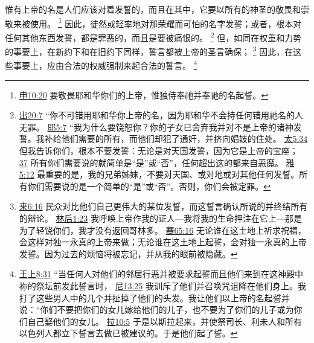 \documentclass[12pt, a4paper, oneside]{ctexart}
\newcounter{parnum}[section]
\newcommand{\N}{%
   \noindent\refstepcounter{parnum}%
    \makebox[\parindent][l]{\textbf{\arabic{parnum}.}}}
\begin{document}
\N 惟有上帝的名是人们应该对着发誓的，而且在其中，它要以所有的神圣的敬畏和崇敬来被使用。
	\footnote {
		\href{https://biblehub.com/deuteronomy/10-20.htm}{申10:20} 要敬畏耶和华你们的上帝，惟独侍奉祂并奉祂的名起誓。
	}
	因此，徒然或轻率地对那荣耀而可怕的名字发誓；或者，根本对任何其他东西发誓，都是罪恶的，而且是要被痛恨的。
	\footnote {
		\href{https://biblehub.com/exodus/20-7.htm}{出20:7} “你不可错用耶和华你上帝的名，因为耶和华不会持任何错用祂名的人无罪。
		\href{https://biblehub.com/jeremiah/5-7.htm}{耶5:7} “我为什么要饶恕你？你的子女已舍弃我并对不是上帝的诸神发誓。我补给他们需要的所有，而他们却犯了通奸，并挤向娼妓的住处。
		\href{https://biblehub.com/matthew/5-34.htm}{太5:34} 但我告诉你们，根本不要发誓：无论是对天国发誓，因为它是上帝的宝座；
		\href{https://biblehub.com/matthew/5-37.htm}{37} 所有你们需要说的就简单是“是”或“否”，任何超出这的都来自恶魔。
		\href{https://biblehub.com/james/5-12.htm}{雅5:12} 最重要的是，我的兄弟姊妹，不要对天国、或对地或对其他任何发誓。所有你们需要说的是一个简单的“是”或“否”。否则，你们会被定罪。
	}
	但，如同在权重和力势的事要上，在新约下和在旧约下同样，誓言都被上帝的圣言确保；
	\footnote {
		\href{https://biblehub.com/hebrews/6-16.htm}{来6:16} 民众对比他们自己更伟大的某位发誓，而这誓言确认所说的并终结所有的辩论。
		\href{https://biblehub.com/2_corinthians/1-23.htm}{林后1:23} 我呼唤上帝作我的证人---我将我的生命押注在它上---那是为了轻饶你们，我才没有返回哥林多。
		\href{https://biblehub.com/isaiah/65-16.htm}{赛65:16} 无论谁在这土地上祈求祝福，会这样对独一永真的上帝来做；无论谁在这土地上起誓，会对独一永真的上帝发誓。因为过去的烦恼将被忘记，并从我的眼前被隐藏。
	}
	因此，在这些事要上，应由合法的权威强制来起合法的誓言。
	\footnote {
		\href{https://biblehub.com/1_kings/8-31.htm}{王上8:31} “当任何人对他们的邻居行恶并被要求起誓而且他们来到在这神殿中祢的祭坛前发此誓言时，
		\href{https://biblehub.com/nehemiah/13-25.htm}{尼13:25} 我训斥了他们并召唤咒诅降在他们身上。我打了这些男人中的几个并扯掉了他们的头发。我让他们以上帝的名起誓并说：“你们不要把你们的女儿嫁给他们的儿子，也不要为了你们的儿子或为你们自己娶他们的女儿。
		\href{https://biblehub.com/ezra/10-5.htm}{拉10:5} 于是以斯拉起来，并使祭司长、利未人和所有以色列人都立下誓言去做已被建议的。于是他们起了誓。
	}
\end{document}
